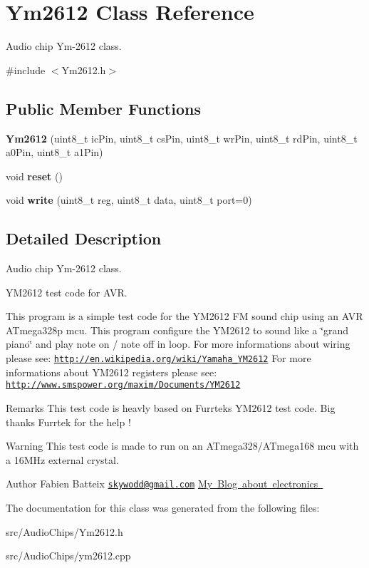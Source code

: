 \hypertarget{classYm2612}{}\section{Ym2612 Class Reference}
\label{classYm2612}


Audio chip Ym-\/2612 class.  




{\ttfamily \#include $<$Ym2612.\+h$>$}

\subsection*{Public Member Functions}
\begin{DoxyCompactItemize}
\item 
\mbox{\label{classYm2612_a350c1ceb0e284eaa9aaa238758a13e67}} 
{\bfseries Ym2612} (uint8\+\_\+t ic\+Pin, uint8\+\_\+t cs\+Pin, uint8\+\_\+t wr\+Pin, uint8\+\_\+t rd\+Pin, uint8\+\_\+t a0\+Pin, uint8\+\_\+t a1\+Pin)
\item 
\mbox{\label{classYm2612_a0bba8e22b38e72b7f1a4efd2745b0c6b}} 
void {\bfseries reset} ()
\item 
\mbox{\label{classYm2612_a01cab1ab6324f32271f3406aefbfb7ab}} 
void {\bfseries write} (uint8\+\_\+t reg, uint8\+\_\+t data, uint8\+\_\+t port=0)
\end{DoxyCompactItemize}


\subsection{Detailed Description}
Audio chip Ym-\/2612 class. 

Y\+M2612 test code for A\+VR.

This program is a simple test code for the Y\+M2612 FM sound chip using an A\+VR A\+Tmega328p mcu. This program configure the Y\+M2612 to sound like a \char`\"{}grand piano\char`\"{} and play note on / note off in loop. For more informations about wiring please see\+: \href{http://en.wikipedia.org/wiki/Yamaha_YM2612}{\tt http\+://en.\+wikipedia.\+org/wiki/\+Yamaha\+\_\+\+Y\+M2612} For more informations about Y\+M2612 registers please see\+: \href{http://www.smspower.org/maxim/Documents/YM2612}{\tt http\+://www.\+smspower.\+org/maxim/\+Documents/\+Y\+M2612}

\begin{DoxyRemark}{Remarks}
This test code is heavly based on Furrtek\textquotesingle{}s Y\+M2612 test code. Big thanks Furrtek for the help ! 
\end{DoxyRemark}
\begin{DoxyWarning}{Warning}
This test code is made to run on an A\+Tmega328/\+A\+Tmega168 mcu with a 16\+M\+Hz external crystal.
\end{DoxyWarning}
\begin{DoxyAuthor}{Author}
Fabien Batteix \href{mailto:skywodd@gmail.com}{\tt skywodd@gmail.\+com} \mbox{\hyperlink{}{My Blog about electronics }}
\end{DoxyAuthor}


The documentation for this class was generated from the following files\+:\begin{DoxyCompactItemize}
\item 
src/\+Audio\+Chips/Ym2612.\+h\item 
src/\+Audio\+Chips/ym2612.\+cpp\end{DoxyCompactItemize}
